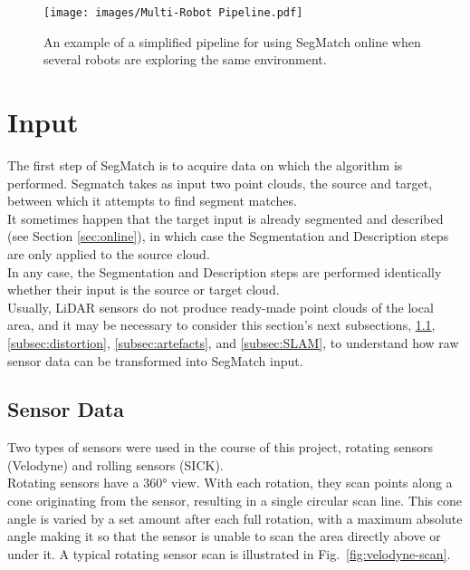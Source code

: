 \begin{figure}
  \centering
  \texttt{[image: images/Multi-Robot Pipeline.pdf]}
  \caption{An example of a simplified pipeline for using SegMatch online when several robots are exploring the same environment.}
  \label{fig:multirobot_pipeline}
\end{figure}

\section{Input}
\label{sec:input}

The first step of SegMatch is to acquire data on which the algorithm is performed. Segmatch takes as input two point clouds, the source and target, between which it attempts to find segment matches.\\

It sometimes happen that the target input is already segmented and described (see Section \ref{sec:online}), in which case the Segmentation and Description steps are only applied to the source cloud.\\

In any case, the Segmentation and Description steps are performed identically whether their input is the source or target cloud.\\

Usually, LiDAR sensors do not produce ready-made point clouds of the local area, and it may be necessary to consider this section's next subsections, \ref{subsec:sensordata}, \ref{subsec:distortion}, \ref{subsec:artefacts}, and \ref{subsec:SLAM}, to understand how raw sensor data can be transformed into SegMatch input.

\subsection{Sensor Data}
\label{subsec:sensordata}

Two types of sensors were used in the course of this project, rotating sensors (Velodyne) and rolling sensors (SICK). \\

Rotating sensors have a 360° view. With each rotation, they scan points along a cone originating from the sensor, resulting in a single circular scan line. This cone angle is varied by a set amount after each full rotation, with a maximum absolute angle making it so that the sensor is unable to scan the area directly above or under it. A typical rotating sensor scan is illustrated in Fig.~\ref{fig:velodyne-scan}.\\ %

